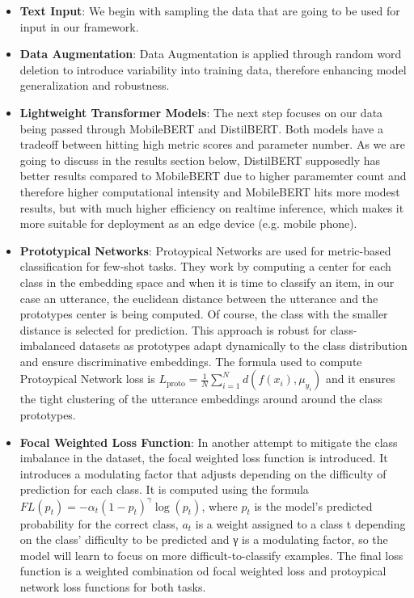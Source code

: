 \documentclass[a4paper,12pt]{article}
\begin{document}
\begin{itemize}
    \item{\textbf{Text Input}}: We begin with sampling the data that are going to be used for input in our framework.
    \item {\textbf{Data Augmentation}}: Data Augmentation is applied through random word deletion to introduce variability into training data, therefore enhancing model generalization and robustness.
    \item {\textbf{Lightweight Transformer Models}}: The next step focuses on our data being passed through MobileBERT and DistilBERT. Both models have a tradeoff between hitting high metric scores and parameter number. As we are going to discuss in the results section below, DistilBERT supposedly has better results compared to MobileBERT due to higher paramemter count and therefore higher computational intensity and MobileBERT hits more modest results, 
        but with much higher efficiency on realtime inference, which makes it more suitable for deployment as an edge device (e.g. mobile phone).
    \item{\textbf{Prototypical Networks}}: Protoypical Networks are used for metric-based classification for few-shot tasks. They work by computing a center for each class in the embedding space and when it is time to classify an item, in our case an utterance, the euclidean distance between the utterance and the prototypes center is being computed. Of course, the class with the smaller distance is selected for prediction. This approach is robust for class-imbalanced datasets as
        prototypes adapt dynamically to the class distribution and ensure discriminative embeddings. The formula used to compute Protoypical Network loss is $L_{\mathrm{proto}} = \frac{1}{N} \sum_{i=1}^{N} d\!\left(f(x_i), \mu_{y_i}\right)$ and it ensures the tight clustering of the utterance embeddings around around the class prototypes.
    \item{\textbf{Focal Weighted Loss Function}}: In another attempt to mitigate the class imbalance in the dataset, the focal weighted loss function is introduced. It introduces a modulating factor that adjusts depending on the difficulty of prediction for each class. It is computed using the formula $FL(p_t) = -\alpha_t (1 - p_t)^{\gamma} \log(p_t)$, where $p_t$ is the model's predicted probability for the correct class, $a_t$ is a weight assigned to a class t depending on the class' difficulty to be predicted
        and γ is a modulating factor, so the model will learn to focus on more difficult-to-classify examples. The final loss function is a weighted combination od focal weighted loss and protoypical network loss functions for both tasks.

\end{itemize}
\end{document}
